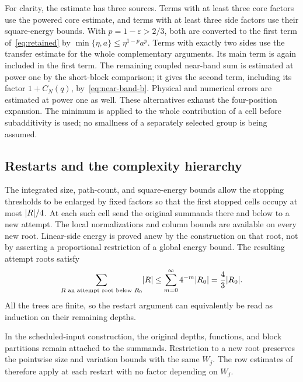 For clarity, the estimate has three sources. Terms with at least
three core factors use the powered core estimate, and terms with at
least three side factors use their square-energy bounds. With
$p=1-\varepsilon>2/3$, both are converted to the first term
of~\eqref{eq:retained} by
$\min\{\eta,a\}\le\eta^{1-p}a^p$.
Terms with exactly two sides use the transfer estimate for the
whole complementary arguments. Its main term is again included in
the first term. The remaining coupled near-band sum is estimated
at power one by the short-block comparison; it gives the second
term, including its factor $1+C_N(q)$, by~\eqref{eq:near-band-b}.
Physical and numerical
errors are estimated at power one as well. These alternatives
exhaust the four-position expansion. The minimum is applied to
the whole contribution of a cell before subadditivity is used;
no smallness of a separately selected group is being assumed.

\subsection{Restarts and the complexity hierarchy}
The integrated size, path-count, and square-energy bounds allow the
stopping thresholds to be enlarged by fixed factors so that the first
stopped cells occupy at most $\lvert R\rvert/4$. At each such cell send the
original summands there and below to a new attempt. The local
normalizations and column bounds are available on every new root.
Linear-side energy is proved anew by the construction on that root,
not by asserting a proportional restriction of a global energy bound.
The resulting attempt roots satisfy
\begin{equation}\label{eq:attempt-packing}
 \sum_{R\text{ an attempt root below }R_0}\lvert R\rvert
 \le\sum_{m=0}^{\infty}4^{-m}\lvert R_0\rvert
 =\frac43\lvert R_0\rvert.
\end{equation}
All the trees are finite, so the restart argument can equivalently be
read as induction on their remaining depths.

In the scheduled-input construction, the original depths, functions,
and block partitions remain attached to the summands. Restriction to
a new root preserves the pointwise size and variation bounds with
the same $W_j$. The row estimates of \cite[Section~4]{V} therefore
apply at each restart with no factor depending on $W_j$.

